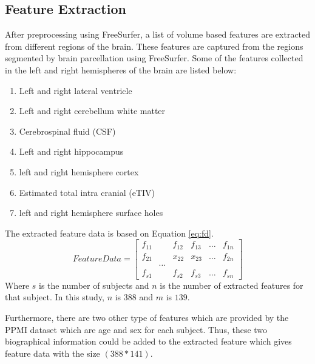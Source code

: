 \documentclass[runningheads,a4paper]{llncs}
\begin{document}
\subsection{Feature Extraction}
After preprocessing using FreeSurfer, a list of volume based features are extracted from different regions of the brain. These features are captured from the regions segmented by brain parcellation using FreeSurfer. Some of the features collected in the left and right hemispheres of the brain are listed below:
\begin{enumerate}
	\item Left and right lateral ventricle
	\item Left and right cerebellum white matter
	\item Cerebrospinal fluid (CSF)
	\item Left and right hippocampus
	\item left and right hemisphere cortex
	\item Estimated total intra cranial (eTIV)
	\item left and right hemisphere surface holes
\end{enumerate}
The extracted feature data is based on Equation \ref{eq:fd}.
\begin{equation}
FeatureData =
\begin{bmatrix}
    f_{11}       & f_{12} & f_{13} & \dots & f_{1n} \\
    f_{21}       & x_{22} & x_{23} & \dots & f_{2n} \\
    \qquad \ldots\\
    f_{s1}       & f_{s2} & f_{s3} & \dots & f_{sn}
\end{bmatrix}
\label{eq:fd}
\end{equation}
Where $s$ is the number of subjects and $n$ is the number of extracted features for that subject. In this study, $n$ is $388$ and $m$ is $139$.

Furthermore, there are two other type of features which are provided by the PPMI dataset which are age and sex for each subject. Thus, these two biographical information could be added to the extracted feature which gives feature data with the size $(388*141)$.
\end{document}
